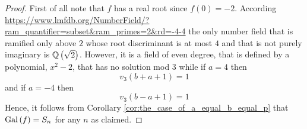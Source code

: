 \documentclass[../main.tex]{subfiles}
\begin{document}
\begin{proof}
  First of all note that $f$ has a real root since $f\left( 0 \right) = -2$. 
  According \url{https://www.lmfdb.org/NumberField/?ram_quantifier=subset&ram_primes=2&rd=-4-4} the only number field that is ramified only above $2$ whose root discriminant is at most $4$ and that is not purely imaginary is $\mathbb{Q}\left( \sqrt{2} \right)$.
  However, it is a field of even degree, that is defined by a polynomial, $x^2 - 2$, that has no solution mod $3$ while if $a = 4$ then
  \[
    v_3\left( b + a + 1 \right) = 1
  \]
  and if $a = -4$ then 
  \[
    v_3\left( b - a + 1 \right) = 1
  \]
  Hence, it follows from Corollary \ref{cor:the_case_of_a_equal_b_equal_p} that $\operatorname{Gal}\left( f \right) = S_n$ for any $n$ as claimed.
\end{proof}




\end{document}
